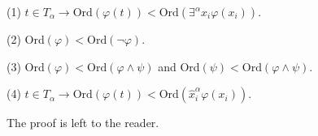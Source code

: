 (1) $t \in T_\alpha \rightarrow \text{Ord}(\varphi(t)) < \text{Ord}(\exists^\alpha x_i \varphi(x_i))$.

(2) Ord$(\varphi) < \text{Ord}(\neg \varphi)$.

(3) Ord$(\varphi) < \text{Ord}(\varphi \wedge \psi)$ and Ord$(\psi) < \text{Ord}(\varphi \wedge \psi)$.

(4) $t \in T_\alpha \rightarrow \text{Ord}(\varphi(t)) < \text{Ord}(\hat{x}_i^\alpha \varphi(x_i))$.

The proof is left to the reader.
